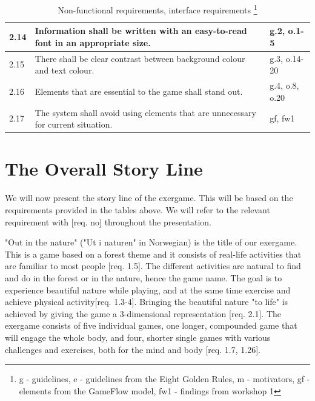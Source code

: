 \begin{minipage}{12 cm}
\begin{table} [H]
\centering
\begin{tabular}{|>{\raggedright}p{}|p{}|p{}|} 
\hline
2.14 & Information shall be written with an easy-to-read font in an appropriate size. &  g.2, o.1-5\\ \hline
2.15 & There shall be clear contrast between background colour and text colour. & g.3, o.14-20 \\ \hline
2.16 & Elements that are essential to the game shall stand out. & g.4, o.8, o.20\\ \hline
2.17 & The system shall avoid using elements that are unnecessary for current situation.  & gf, fw1\\ \hline
\end{tabular}
\caption[Non-functional requirements, part 2]{Non-functional requirements, interface requirements \footnote{g - guidelines, e - guidelines from the Eight Golden Rules, m - motivators, gf - elements from the GameFlow model, fw1 - findings from workshop 1}}
\label{tab:nonfunc2}
\end{table} 
\end{minipage}

\section{The Overall Story Line}
\label{sec:outinthenature}
We will now present the story line of the exergame. This will be based on the requirements provided in the tables above. We will refer to the relevant requirement with [req. no] throughout the presentation. 

"Out in the nature" ("Ut i naturen" in Norwegian) is the title of our exergame. This is a game based on a forest theme and it consists of real-life activities that are familiar to most people [req. 1.5]. The different activities are natural to find and do in the forest or in the nature, hence the game name. The goal is to experience beautiful nature while playing, and at the same time exercise and achieve physical activity[req. 1.3-4]. Bringing the beautiful nature "to life" is achieved by giving the game a 3-dimensional representation [req. 2.1]. The exergame consists of five individual games, one longer, compounded game that will engage the whole body, and four, shorter single games with various challenges and exercises, both for the mind and body [req. 1.7, 1.26].        

